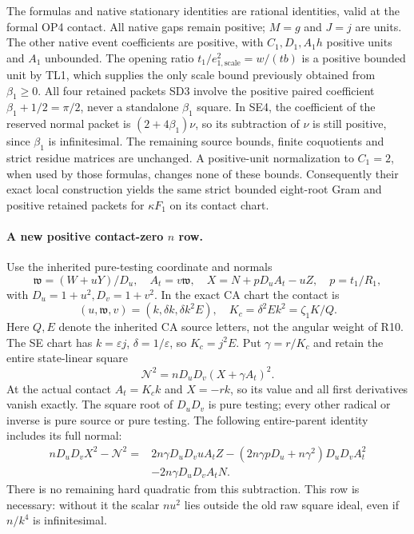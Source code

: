 The formulas and native stationary identities are rational identities,
valid at the formal OP4 contact. All native gaps remain positive; $M=g$
and $J=j$ are units. The other native event coefficients are positive,
with $C_1,D_1,A_1h$ positive units and $A_1$ unbounded. The opening
ratio $t_1/e_{1,\mathrm{scale}}^2=w/(tb)$ is a positive bounded unit
by TL1, which supplies the only scale bound previously obtained from
$\beta_1\ge0$. All four retained packets SD3 involve the positive
paired coefficient $\beta_1+1/2=\pi/2$, never a standalone
$\beta_1$ square. In SE4, the coefficient of the reserved normal packet
is $(2+4\beta_1)\nu$, so its subtraction of $\nu$ is still positive,
since $\beta_1$ is infinitesimal. The remaining source bounds, finite
coquotients and strict residue matrices are unchanged. A positive-unit
normalization to $C_1=2$, when used by those formulas, changes none of
these bounds. Consequently their exact local construction yields the
same strict bounded eight-root Gram and positive retained packets for
$\kappa F_1$ on its contact chart.

\paragraph{A new positive contact-zero $n$ row.}
Use the inherited pure-testing coordinate and normals
\[
 \mathfrak w=(W+uY)/D_u,\quad A_t=v\mathfrak w,\quad
 X=N+pD_uA_t-uZ,\quad p=t_1/R_1,
\]
with $D_u=1+u^2,D_v=1+v^2$. In the exact CA chart the contact is
\[
 (u,\mathfrak w,v)=(k,\delta k,\delta k^2E),\quad
 K_c=\delta^2Ek^2=\zeta_1K/Q.
\]
Here $Q,E$ denote the inherited CA source letters, not the angular
weight of R10. The SE chart has $k=\varepsilon j$,
$\delta=1/\varepsilon$, so $K_c=j^2E$.
Put $\gamma=r/K_c$ and retain the entire state-linear square
\[
 \boxed{\quad \mathcal N^2=nD_uD_v(X+\gamma A_t)^2.\quad}
\tag{TL4}
\]
At the actual contact $A_t=K_ck$ and $X=-rk$, so its value and
all first derivatives vanish exactly. The square root of $D_uD_v$ is
pure testing; every other radical or inverse is pure source or pure
testing. The following entire-parent identity includes its full normal:
\[
\begin{split}
 nD_uD_vX^2-\mathcal N^2
 ={}&2n\gamma D_uD_vuA_tZ
 -(2n\gamma pD_u+n\gamma^2)D_uD_vA_t^2\\
 &-2n\gamma D_uD_vA_tN.
\end{split}
\tag{TL5}
\]
There is no remaining hard quadratic from this subtraction. This row
is necessary: without it the scalar $nu^2$ lies outside the old raw
square ideal, even if $n/k^4$ is infinitesimal.

